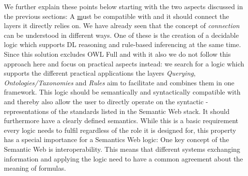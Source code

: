We further explain these points below starting with the two aspects discussed in the previous sections:
A \ul must be compatible with \rdf and it should 
 connect the layers it directly relies on. We have already seen that the concept of \emph{connection} can be understood in different ways. One of these is the creation of a 
 decidable logic which supports DL reasoning and rule-based inferencing at the same time. Since this solution excludes OWL Full and with it also \rdf we do not follow this approach here 
 and focus on practical aspects instead: we search for a logic which supports the different practical applications the layers \emph{Querying}, \emph{Ontologies/Taxonomies} and 
 \emph{Rules} aim to facilitate and combines them in one framework. This logic should be semantically and syntactically compatible with \rdf and
 thereby also allow the user to directly operate 
 on the syntactic \rdf-representations 
 of the standards listed in the Semantic Web stack. It should furthermore have a clearly defined semantics. While this is a basic requirement every logic needs to fulfil 
 regardless of the role it is designed for, this property has a special importance for a Semantics Web logic: One key concept of 
the Semantic Web is interoperability. This means that different systems exchanging information and applying the logic need to have a common agreement about 
the meaning of formulas.
 
